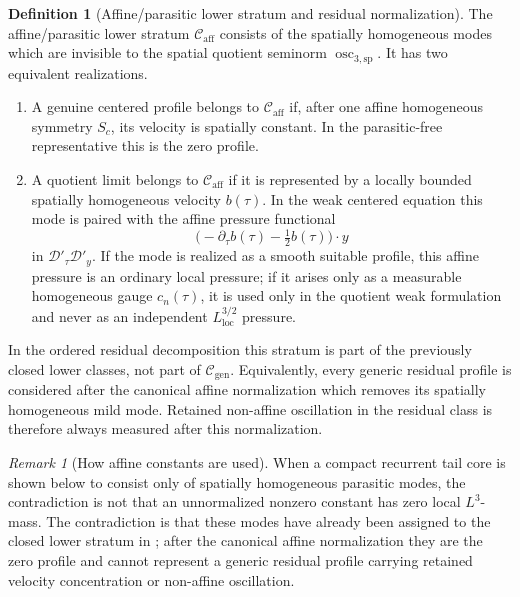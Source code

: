 \documentclass[11pt]{amsart}
\numberwithin{equation}{section}
\theoremstyle{plain}
\theoremstyle{definition}
\newtheorem{definition}[definition]{Definition}
\theoremstyle{remark}
\newtheorem{remark}[remark]{Remark}
\newcommand{\loc}{\mathrm{loc}}
\newcommand{\Caff}{\mathcal C_{\mathrm{aff}}}
\newcommand{\Cgen}{\mathcal C_{\mathrm{gen}}}
\newcommand{\oscsp}{\operatorname{osc}_{3,\mathrm{sp}}}
\begin{document}
\begin{definition}[Affine/parasitic lower stratum and residual normalization]
\label{def:affine-constant-lower-stratum}
The affine/parasitic lower stratum \(\Caff\) consists of the spatially
homogeneous modes which are invisible to the spatial quotient seminorm
\(\oscsp\).  It has
two equivalent realizations.
\begin{enumerate}[label=\textup{(\roman*)}]
   \item A genuine centered profile belongs to \(\Caff\) if, after one affine
   homogeneous symmetry \(S_c\), its velocity is spatially constant.  In the
   parasitic-free representative this is the zero profile.
   \item A quotient limit belongs to \(\Caff\) if it is represented by a
   locally bounded spatially homogeneous velocity \(b(\tau)\).  In the weak
   centered equation this mode is paired with the affine pressure functional
   \[
      \bigl(-\partial_\tau b(\tau)-\tfrac12 b(\tau)\bigr)\cdot y
   \]
   in \(\mathcal D'_\tau\mathcal D'_y\).  If the mode is realized as a smooth
   suitable profile, this affine pressure is an ordinary local pressure; if it
   arises only as a measurable homogeneous gauge \(c_n(\tau)\), it is used only
   in the quotient weak formulation and never as an independent
   \(L^{3/2}_{\loc}\) pressure.
\end{enumerate}
In the ordered residual decomposition this stratum is part of the previously
closed lower classes, not part of \(\Cgen\).  Equivalently, every generic
residual profile is considered after the canonical affine normalization which
removes its spatially homogeneous mild mode.  Retained non-affine oscillation in
the residual class is therefore always measured after this normalization.
\end{definition}

\begin{remark}[How affine constants are used]
\label{rem:affine-constant-use}
When a compact recurrent tail core is shown below to consist only of spatially
homogeneous parasitic modes, the contradiction is not that an unnormalized
nonzero constant has zero local \(L^3\)-mass.  The contradiction is that these
modes have already been assigned to the closed lower stratum in
; after the canonical affine
normalization they are the zero profile and cannot represent a generic residual
profile carrying retained velocity concentration or non-affine oscillation.
\end{remark}
\end{document}
